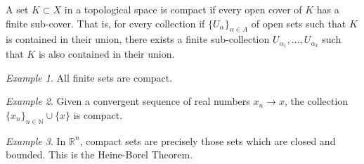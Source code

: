\documentclass[11pt]{article}
\newcommand{\R}{\mathbb{R}}
\newcommand{\N}{\mathbb{N}}
\theoremstyle{definition}
\theoremstyle{remark}
\newtheorem*{example}{Example}
\numberwithin{equation}{section}
\begin{document}
    \begin{definition}
        A set $K \subset X$ in a topological space is compact if every open cover of
        $K$ has a finite sub-cover. That is, for every collection if
        $\{U_\alpha\}_{\alpha \in A}$ of open sets such that $K$ is contained in
        their union, there exists a finite sub-collection $U_{\alpha_1}, \dots,
        U_{\alpha_k}$ such that $K$ is also contained in their union.
    \end{definition}
    \begin{example}
        All finite sets are compact.
    \end{example}
    \begin{example}
        Given a convergent sequence of real numbers $x_n \to x$, the collection
        $\{x_n\}_{n \in \N} \cup \{x\}$ is compact.
    \end{example}
    \begin{example}
        In $\R^n$, compact sets are precisely those sets which are closed and
        bounded. This is the Heine-Borel Theorem.
    \end{example}
\end{document}
